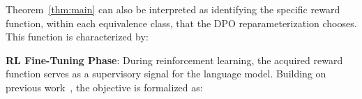 Theorem~\ref{thm:main} can also be interpreted as identifying the specific reward function, within each equivalence class, that the DPO reparameterization chooses. This function is characterized by:

\textbf{RL Fine-Tuning Phase}: During reinforcement learning, the acquired reward function serves as a supervisory signal for the language model. Building on previous work~\citep{jaques2017sequence, jaques2020human}, the objective is formalized as:
